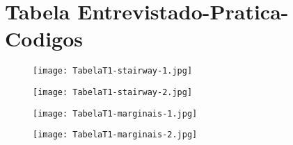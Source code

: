 \chapter{Tabela Entrevistado-Pratica-Codigos}
\hypertarget{tabela1}{}

\begin{figure}[ht]
\begin{center}
\texttt{[image: TabelaT1-stairway-1.jpg]}
\end{center}
\end{figure}

\begin{figure}[ht]
\begin{center}
\texttt{[image: TabelaT1-stairway-2.jpg]}
\end{center}
\end{figure}

\begin{figure}[ht]
\begin{center}
\texttt{[image: TabelaT1-marginais-1.jpg]}
\end{center}
\end{figure}

\begin{figure}[ht]
\begin{center}
\texttt{[image: TabelaT1-marginais-2.jpg]}
\end{center}
\end{figure}
